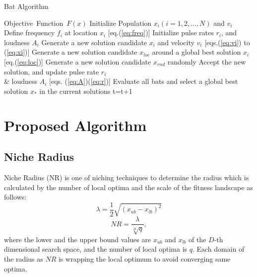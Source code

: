 \documentclass[conference]{IEEEtran}
\begin{document}
\begin{algorithm}[H]
\caption{Bat Algorithm}
\label{code:ba}
\begin{algorithmic}[1]
\REQUIRE Objective\ Function\ $F(x)$
\STATE Initialize Population $x_i(i=1,2,..., N)$ and $v_i$\\
\STATE Define frequency $f_i$ at location $x_i$ [eq.(\ref{eq:freq})]
\STATE Initialize pulse rates $r_i$, and loudness $A_i$
\STATE Generate a new solution candidate $x_i$ and velocity $v_i$ [eqs.(\ref{eq:vi}) to (\ref{eq:xi})]
\STATE Generate a new solution candidate $x_{loc}$ around a global best solution $x_i$ [eq.(\ref{eq:loc})] 
\ENDIF
\STATE Generate a new solution candidate $x_{rnd}$ randomly
\STATE Accept the new solution, and update pulse rate $r_i$ \\ \& loudness $A_i$ [eqs. (\ref{eq:A})(\ref{eq:r})]  
\ENDIF
\STATE Evaluate all bats and select a global best solution $x_*$ in the current solutions
\ENDFOR
\STATE t=t+1
\ENDWHILE
\end{algorithmic}
\end{algorithm}

\section{Proposed Algorithm}
\subsection{Niche Radius}
Niche Radius (NR) \cite{Niche}\cite{DNCMA} is one of niching techniques to determine the radius which is calculated by the number of local optima and the scale of the fitness landscape as follows:
\begin{equation}
\label{eq:lambda}
\lambda =\frac{1}{2} \sqrt{(x_{ub}-x_{lb})^2}
\end{equation}
\begin{equation}
\label{eq:NR}
NR=\frac{\lambda}{\sqrt[D]{q}},
\end{equation}
where the lower and the upper bound values are $x_{ub}$ and $x_{lb}$ of the $D$-th dimensional search space,   and the number of local optima is $q$. Each domain of the radius as $NR$ is wrapping the local optimum to avoid converging same optima.
\end{document}
